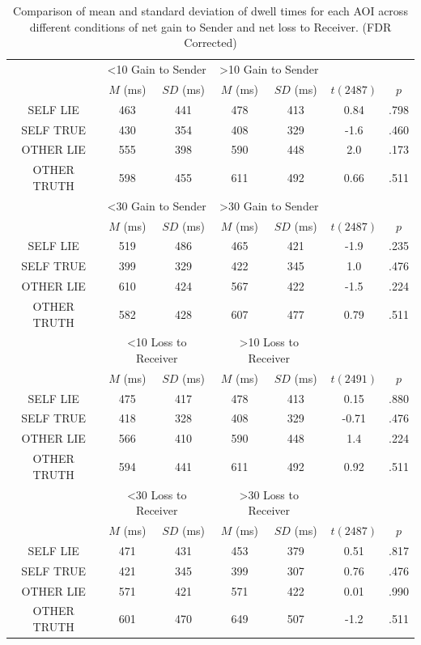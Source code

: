 \documentclass[man, floatsintext]{apa7}
\begin{document}
\begin{table}[H]
	\centering
	\begin{tabular}{ccccccc}
		\multirow{2}{*}{} & \multicolumn{2}{c}{<10 Gain to Sender} & \multicolumn{2}{c}{>10 Gain to Sender} & \multicolumn{2}{c}{} \\ \cline{2-5}
		& $M$ (ms) &$SD$ (ms) & $M$ (ms) & $SD$ (ms) & $t(2487)$ & $p$ \\ \hline
		SELF LIE & 463 & 441 & 478 & 413 & 0.84 & .798  \\ \hline
		SELF TRUE & 430 & 354 & 408 & 329 & -1.6 & .460  \\ \hline
		OTHER LIE & 555 & 398 & 590 & 448 & 2.0 & .173 \\ \hline
		OTHER TRUTH & 598 & 455 & 611 & 492 & 0.66 & .511 \\ \hline
		\multirow{2}{*}{} & \multicolumn{2}{c}{<30 Gain to Sender} & \multicolumn{2}{c}{>30 Gain to Sender} & \multicolumn{2}{c}{} \\ \cline{2-5}
		& $M$ (ms) &$SD$ (ms) & $M$ (ms) &$SD$ (ms) & $t(2487)$ & $p$ \\ \hline
		SELF LIE & 519 & 486 & 465 & 421 & -1.9 & .235  \\ \hline
		SELF TRUE & 399 & 329 & 422 & 345 & 1.0 & .476  \\ \hline
		OTHER LIE & 610 & 424 & 567 & 422 & -1.5 & .224 \\ \hline
		OTHER TRUTH & 582 & 428 & 607 & 477 & 0.79 & .511 \\ \hline
		\multirow{2}{*}{} & \multicolumn{2}{c}{<10 Loss to Receiver} & \multicolumn{2}{c}{>10 Loss to Receiver} & \multicolumn{2}{c}{} \\ \cline{2-5}
		& $M$ (ms) &$SD$ (ms) & $M$ (ms) & $SD$ (ms) & $t(2491)$ & $p$ \\ \hline
		SELF LIE & 475 & 417 & 478 & 413 & 0.15 & .880  \\ \hline
		SELF TRUE & 418 & 328 & 408 & 329 & -0.71 & .476  \\ \hline
		OTHER LIE & 566 & 410 & 590 & 448 & 1.4 & .224 \\ \hline
		OTHER TRUTH & 594 & 441 & 611 & 492 & 0.92 & .511 \\ \hline
		\multirow{2}{*}{} & \multicolumn{2}{c}{<30 Loss to Receiver} & \multicolumn{2}{c}{>30 Loss to Receiver} & \multicolumn{2}{c}{} \\ \cline{2-5}
		& $M$ (ms) & $SD$ (ms) & $M$ (ms) &$SD$ (ms) & $t(2487)$ & $p$ \\ \hline
		SELF LIE & 471 & 431 & 453 & 379 & 0.51 & .817  \\ \hline
		SELF TRUE & 421 & 345 & 399 & 307 & 0.76 & .476 \\ \hline
		OTHER LIE & 571 & 421 & 571 & 422 & 0.01 & .990 \\ \hline
		OTHER TRUTH & 601 & 470 & 649 & 507 & -1.2 & .511 \\ \hline
	\end{tabular}
	\vspace{0.3cm}
	\caption{Comparison of mean and standard deviation of dwell times for each AOI across different conditions of net gain to Sender and net loss to Receiver. (FDR Corrected)}
	\label{tab:CombinedNetDwell}
\end{table}
\end{document}
